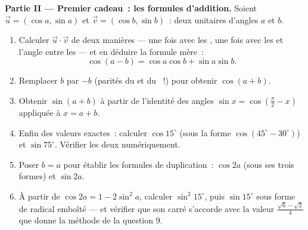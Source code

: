 \begin{problem}
\medskip
\noindent\textbf{Partie II --- Premier cadeau~: les formules
d'addition.}
Soient $\vec u = (\cos a, \sin a)$ et $\vec v = (\cos b, \sin b)$~:
deux  unitaires d'angles $a$ et $b$.
\begin{enumerate}[resume]
  \item Calculer $\vec u \cdot \vec v$ de deux manières --- une fois
        avec les , une fois avec les  et l'angle
        entre les  --- et en déduire la formule mère~:
        \[
        \cos(a - b) = \cos a \cos b + \sin a \sin b .
        \]
  \item Remplacer $b$ par $-b$ (parités du  et du ~!)
        pour obtenir $\cos(a + b)$.
  \item Obtenir $\sin(a + b)$ à partir de l'identité des angles
         $\sin x = \cos\left(\frac\pi2 - x\right)$
        appliquée à $x = a + b$.
  \item Enfin des valeurs exactes~: calculer $\cos 15^\circ$ (sous
        la forme $\cos(45^\circ - 30^\circ)$) et $\sin 75^\circ$.
        Vérifier les deux numériquement.
  \item Poser $b = a$ pour établir les formules de duplication~:
        $\cos 2a$ (sous ses trois formes) et $\sin 2a$.
  \item À partir de $\cos 2a = 1 - 2\sin^2 a$, calculer
        $\sin^2 15^\circ$, puis $\sin 15^\circ$ sous forme de radical
        emboîté --- et vérifier que son carré s'accorde avec la
        valeur $\frac{\sqrt6 - \sqrt2}{4}$ que donne la méthode de
        la question 9.
\end{enumerate}


\end{problem}
